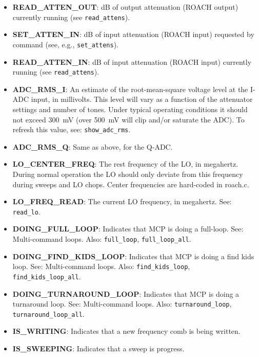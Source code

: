 \begin{itemize}[leftmargin=*,label={}]
\item \textbf{READ\_ATTEN\_OUT}: dB of output attenuation (ROACH output) currently running (see \texttt{read\_attens}).

\item \textbf{SET\_ATTEN\_IN}: dB of input attenuation (ROACH input) requested by command (see, e.g., \texttt{set\_attens}).

\item \textbf{READ\_ATTEN\_IN}: dB of input attenuation (ROACH input) currently running (see \texttt{read\_attens}).

\item \textbf{ADC\_RMS\_I}: An estimate of the root-mean-square voltage level at the I-ADC input, in millivolts. This level will vary as a function of the attenuator settings and number of tones. Under typical operating conditions it should not exceed 300~mV (over 500~mV will clip and/or saturate the ADC). To refresh this value, see: \texttt{show\_adc\_rms}.

\item \textbf{ADC\_RMS\_Q}: Same as above, for the Q-ADC\@.

\item \textbf{LO\_CENTER\_FREQ}: The rest frequency of the LO, in megahertz. During normal operation the LO should only deviate from this frequency during sweeps and LO chops. Center frequencies are hard-coded in roach.c.

\item \textbf{LO\_FREQ\_READ}: The current LO frequency, in megahertz. See: \texttt{read\_lo}.

\item \textbf{DOING\_FULL\_LOOP}: Indicates that MCP is doing a full-loop. See: Multi-command loops. Also: \texttt{full\_loop}, \texttt{full\_loop\_all}.

\item \textbf{DOING\_FIND\_KIDS\_LOOP}: Indicates that MCP is doing a find kids loop. See: Multi-command loops. Also: \texttt{find\_kids\_loop}, \texttt{find\_kids\_loop\_all}.

\item \textbf{DOING\_TURNAROUND\_LOOP}: Indicates that MCP is doing a turnaround loop. See: Multi-command loops. Also: \texttt{turnaround\_loop}, \texttt{turnaround\_loop\_all}.

\item \textbf{IS\_WRITING}: Indicates that a new frequency comb is being written.

\item \textbf{IS\_SWEEPING}: Indicates that a sweep is progress.


\end{itemize}
